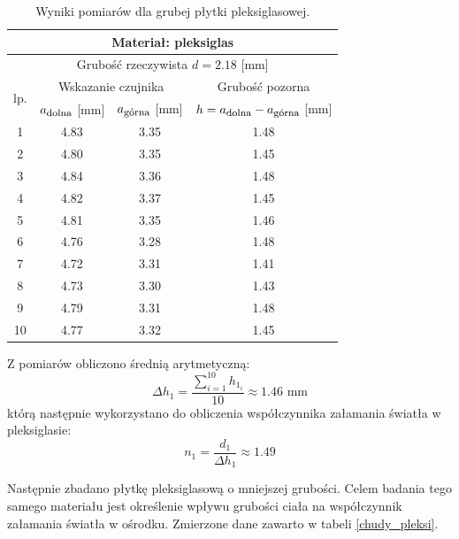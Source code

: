 \documentclass[a4paper,12pts]{article}
\begin{document}
	\begin{table}[!h]
		\centering
		\begin{tabular}{| c | c | c | c |}
			\hline
			\multicolumn{4}{|c|}{Materiał: pleksiglas}  \\ \hline
			\multicolumn{4}{|c|}{Grubość rzeczywista $d = 2.18$ [mm] } \\ \hline
			\multirow{2}{*}{lp.} & \multicolumn{2}{|c|}{Wskazanie czujnika} & Grubość pozorna \\ \cline{2-4}
			& $a_{\textrm{\footnotesize dolna}}$ [mm] & $a_{\textrm{\footnotesize górna}}$ [mm] & $h = a_{\textrm{\footnotesize dolna}} - a_{\textrm{\footnotesize górna}}$ [mm] \\ \hline
			1  & 4.83 & 3.35 & 1.48 \\ \hline
			2  & 4.80 & 3.35 & 1.45 \\ \hline
			3  & 4.84 & 3.36 & 1.48 \\ \hline
			4  & 4.82 & 3.37 & 1.45 \\ \hline
			5  & 4.81 & 3.35 & 1.46 \\ \hline
			6  & 4.76 & 3.28 & 1.48 \\ \hline
			7  & 4.72 & 3.31 & 1.41 \\ \hline
			8  & 4.73 & 3.30 & 1.43 \\ \hline
			9  & 4.79 & 3.31 & 1.48 \\ \hline
			10 & 4.77 & 3.32 & 1.45 \\ \hline
		\end{tabular}
		\caption{Wyniki pomiarów dla grubej płytki pleksiglasowej.}
		\label{gruby_pleksi}
	\end{table}
	\newpage
	Z pomiarów obliczono średnią arytmetyczną:
	\begin{equation}
		\Delta h_1 = \frac{\sum_{i = 1}^{10} h_{1_i}}{10} \approx 1.46 \textrm{ mm}
	\end{equation}
	którą następnie wykorzystano do obliczenia współczynnika załamania światła w pleksiglasie:
	\begin{equation}
		n_1 = \frac{d_1}{\Delta h_1} \approx 1.49
	\end{equation}
	
	Następnie zbadano płytkę pleksiglasową o mniejszej grubości. Celem badania tego samego materiału jest określenie wpływu grubości ciała na współczynnik załamania światła w ośrodku. Zmierzone dane zawarto w tabeli \ref{chudy_pleksi}.
	
\end{document}
